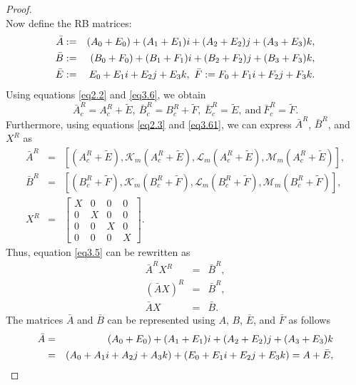 \documentclass[10pt,a4paper]{amsart}
\def \i{\textit{\textbf{i}}}
\def \j{\textit{\textbf{j}}}
\def \k{\textit{\textbf{k}}}
\begin{document}
\begin{proof}
\begin{equation}
	\end{equation}
	Now define the RB matrices:
	\begin{eqnarray*}
		\bar{A}&:=& (A_{0}+E_{0})+ (A_{1}+E_{1})\i+ (A_{2}+E_{2})\j+ (A_{3}+E_{3})\k, \\
		\bar{B}&:=& (B_0+ F_0)+ (B_1+ F_1)\i+ (B_2+ F_2)\j+ (B_3+ F_3)\k, \\
		\bar{E}&:=& E_{0}+ E_{1}\i+ E_{2}\j+ E_{3}\k, ~ \bar{F}:= F_0+ F_1\i+ F_2\j+ F_3\k.
	\end{eqnarray*}
	Using equations \eqref{eq2.2} and \eqref{eq3.6}, we obtain
	\begin{equation}\label{eq3.61}
		\bar{A}_c^R= A^R_c+ \widetilde{E}, ~	\bar{B}_c^R= B^R_c+\widetilde{F}, ~ \bar{E}_c^R=  \widetilde{E}, ~ \textrm{and} ~ \bar{F}_c^R= \widetilde{F}.
	\end{equation}
Furthermore, using equations \eqref{eq2.3} and \eqref{eq3.61}, we can express $\bar{A}^R$, $\bar{B}^R$, and $X^R$ as
	\begin{eqnarray*}
		\bar{A}^R&=& \left[(A^R_c+ \widetilde{E}), \mathcal{K}_m(A^R_c+ \widetilde{E}), \mathcal{L}_m(A^R_c+ \widetilde{E}), \mathcal{M}_m(A^R_c+ \widetilde{E})\right], \\
		\bar{B}^R&=& \left[(B^R_c+\widetilde{F}), \mathcal{K}_m(B^R_c+\widetilde{F}), \mathcal{L}_m(B^R_c+\widetilde{F}), \mathcal{M}_m(B^R_c+\widetilde{F})\right],\\
		X^R&=& 
		\begin{bmatrix}
			X & 0 & 0 & 0 \\
			0 & X & 0 & 0 \\
			0 & 0 & X & 0 \\
			0 & 0 & 0 & X
		\end{bmatrix}.
	\end{eqnarray*}
	Thus, equation \eqref{eq3.5} can be rewritten as
	\begin{eqnarray}
		\bar{A}^R X^R&=& \bar{B}^R, \label{eq3.7}\\
		(\bar{A}X)^R&=& \bar{B}^R, \nonumber\\
		\bar{A}X&=& \bar{B}. \label{eq3.8}
	\end{eqnarray}
	The matrices $\bar{A}$ and $\bar{B}$ can be represented using $A$, $B$, $\bar{E}$, and $\bar{F}$ as follows
	\begin{eqnarray}
		\bar{A}&=& (A_{0}+ E_{0})+ (A_{1}+ E_{1})\i+ (A_{2}+ E_{2})\j+ (A_{3}+ E_{3})\k \nonumber \\
		&=& (A_0+ A_1\i+ A_2\j+ A_3\k)+ (E_0 +E_1\i+ E_2\j+ E_3\k) = A+ \bar{E}, \label{eq3.9}
	\end{eqnarray}

\end{proof}
\end{document}
